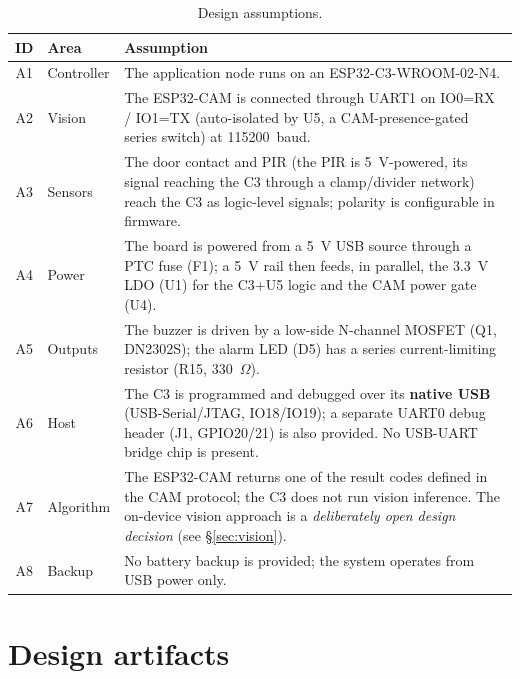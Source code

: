 \documentclass[11pt,a4paper]{article}
\begin{document}
\begin{table}[H]
    \centering
    \caption{Design assumptions.}
    \label{tab:assumptions}
    \begin{tabular}{@{}clp{8cm}@{}}
        \toprule
        \textbf{ID} & \textbf{Area} & \textbf{Assumption} \\
        \midrule
        A1 & Controller & The application node runs on an ESP32-C3-WROOM-02-N4. \\
        A2 & Vision & The ESP32-CAM is connected through UART1 on IO0=RX / IO1=TX (auto-isolated by U5, a CAM-presence-gated series switch) at 115200~baud. \\
        A3 & Sensors & The door contact and PIR (the PIR is 5~V-powered, its signal reaching the C3 through a clamp/divider network) reach the C3 as logic-level signals; polarity is configurable in firmware. \\
        A4 & Power & The board is powered from a 5~V USB source through a PTC fuse (F1); a 5~V rail then feeds, in parallel, the 3.3~V LDO (U1) for the C3+U5 logic and the CAM power gate (U4). \\
        A5 & Outputs & The buzzer is driven by a low-side N-channel MOSFET (Q1, DN2302S); the alarm LED (D5) has a series current-limiting resistor (R15, 330~$\Omega$). \\
        A6 & Host & The C3 is programmed and debugged over its \textbf{native USB} (USB-Serial/JTAG, IO18/IO19); a separate UART0 debug header (J1, GPIO20/21) is also provided. No USB-UART bridge chip is present. \\
        A7 & Algorithm & The ESP32-CAM returns one of the result codes defined in the CAM protocol; the C3 does not run vision inference. The on-device vision approach is a \emph{deliberately open design decision} (see \S\ref{sec:vision}). \\
        A8 & Backup & No battery backup is provided; the system operates from USB power only. \\
        \bottomrule
    \end{tabular}
\end{table}

\section{Design artifacts}
\end{document}
